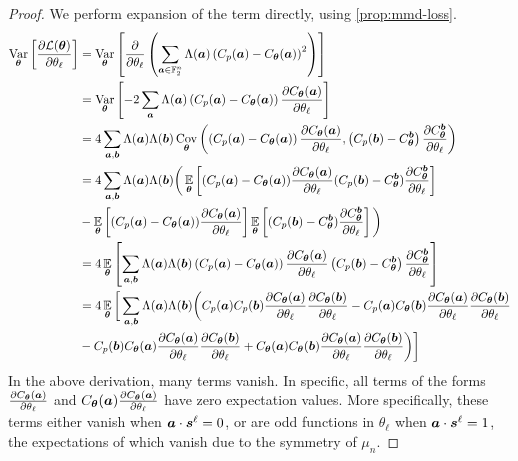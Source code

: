 \documentclass{article}
\theoremstyle{plain}
\theoremstyle{definition}
\theoremstyle{remark}
\begin{document}
\begin{proof}
We perform expansion of the term directly, using \cref{prop:mmd-loss}.
\begin{align*}
    \operatorname*{Var}_{{\bm{\theta}}} \left[ \frac{\partial \mathcal{L}({\bm{\theta}})}{\partial \theta_\ell} \right] &=    \operatorname*{Var}_{{\bm{\theta}}} \left[ \frac{\partial }{\partial \theta_\ell}  \left(\sum_{{\bm{a}} \in \mathbb{F}_2^n} \Lambda({\bm{a}})\left(C_p({\bm{a}}) - C_{\bm{\theta}}({\bm{a}}) \right)^2\right)\right]
\\ &= \operatorname*{Var}_{{\bm{\theta}}} \left[-2 \sum_{\bm{a}} \Lambda({\bm{a}}) \left(C_p({\bm{a}}) - C_{\bm{\theta}}({\bm{a}}) \right) \frac{\partial C_{\bm{\theta}}({\bm{a}})}{\partial \theta_\ell} \right] \\
&= 4 \sum_{{\bm{a}}, {\bm{b}}} \Lambda({\bm{a}}) \Lambda({\bm{b}}) \operatorname*{Cov}_{{\bm{\theta}}}\left(\left(C_p({\bm{a}}) - C_{\bm{\theta}}({\bm{a}})\right) \frac{\partial C_{\bm{\theta}}({\bm{a}})}{\partial \theta_\ell} , \left(C_p({\bm{b}}) - C^{\bm{b}}_{\bm{\theta}}\right) \frac{\partial C^{\bm{b}}_{\bm{\theta}}}{\partial \theta_\ell} \right) \\
&= 4 \sum_{{\bm{a}}, {\bm{b}}} \Lambda({\bm{a}}) \Lambda({\bm{b}}) \bigg(\operatorname*{\mathbb{E}}_{{\bm{\theta}}} \left[ (C_p({\bm{a}}) - C_{\bm{\theta}}({\bm{a}})) \frac{\partial C_{\bm{\theta}}({\bm{a}})}{\partial \theta_\ell} (C_p({\bm{b}}) - C^{\bm{b}}_{\bm{\theta}}) \frac{\partial C^{\bm{b}}_{\bm{\theta}}}{\partial \theta_\ell} \right] \\
&- \operatorname*{\mathbb{E}}_{{\bm{\theta}}}\left[(C_p({\bm{a}}) - C_{\bm{\theta}}({\bm{a}})) \frac{\partial C_{\bm{\theta}}({\bm{a}})}{\partial \theta_\ell} \right] \operatorname*{\mathbb{E}}_{{\bm{\theta}}}\left[(C_p({\bm{b}}) - C^{\bm{b}}_{\bm{\theta}}) \frac{\partial C^{\bm{b}}_{\bm{\theta}}}{\partial \theta_\ell} \right] \bigg) \\
&= 4 \operatorname*{\mathbb{E}}_{{\bm{\theta}}} \left[\sum_{{\bm{a}}, {\bm{b}}} \Lambda({\bm{a}}) \Lambda({\bm{b}})  \left( C_p({\bm{a}}) - C_{\bm{\theta}}({\bm{a}}) \right) \frac{\partial C_{\bm{\theta}}({\bm{a}})}{\partial \theta_\ell} \left(C_p({\bm{b}}) - C^{\bm{b}}_{\bm{\theta}}\right) \frac{\partial C^{\bm{b}}_{\bm{\theta}}}{\partial \theta_\ell} \right] \\
&= 4 \operatorname*{\mathbb{E}}_{{\bm{\theta}}}\bigg[ \sum_{{\bm{a}}, {\bm{b}}} \Lambda({\bm{a}}) \Lambda({\bm{b}}) \bigg( C_p({\bm{a}}) C_p({\bm{b}}) \frac{\partial C_{\bm{\theta}}({\bm{a}})}{\partial \theta_\ell} \frac{\partial C_{\bm{\theta}}({\bm{b}})}{\partial \theta_\ell} - C_p({\bm{a}}) C_{\bm{\theta}}({\bm{b}}) \frac{\partial C_{\bm{\theta}}({\bm{a}})}{\partial \theta_\ell} \frac{\partial C_{\bm{\theta}}({\bm{b}})}{\partial \theta_\ell}\\
& - C_p({\bm{b}}) C_{\bm{\theta}}({\bm{a}}) \frac{\partial C_{\bm{\theta}}({\bm{a}})}{\partial \theta_\ell} \frac{\partial C_{\bm{\theta}}({\bm{b}})}{\partial \theta_\ell} + C_{\bm{\theta}}({\bm{a}}) C_{\bm{\theta}}({\bm{b}}) \frac{\partial C_{\bm{\theta}}({\bm{a}})}{\partial \theta_\ell} \frac{\partial C_{\bm{\theta}}({\bm{b}})}{\partial \theta_\ell}\bigg) \bigg]
\end{align*}
In the above derivation, many terms vanish. In specific, all terms of the forms $\frac{\partial C_{\bm{\theta}}({\bm{a}})}{\partial \theta_\ell} $ and $C_{\bm{\theta}}({\bm{a}})\frac{\partial C_{\bm{\theta}}({\bm{a}})}{\partial \theta_\ell}$ have zero expectation values. More specifically, these terms either vanish when ${\bm{a}} \cdot{\bm{s}^\ell} =0$, or are odd functions in $\theta_\ell$ when ${\bm{a}} \cdot{\bm{s}^\ell} =1$, the expectations of which vanish due to the symmetry of $\mu_n$.
\end{proof}
\end{document}
